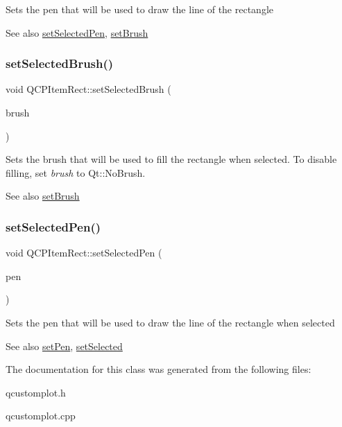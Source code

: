 Sets the pen that will be used to draw the line of the rectangle

\begin{DoxySeeAlso}{See also}
\hyperlink{class_q_c_p_item_rect_a52a1bcb2dc753a538e406a2ba3cf21ce}{set\+Selected\+Pen}, \hyperlink{class_q_c_p_item_rect_abbd4e346a03513ee466afc25d9c75446}{set\+Brush} 
\end{DoxySeeAlso}
\mbox{\label{class_q_c_p_item_rect_abd1792859844118dedee86223cede7af}} 
\subsubsection{\texorpdfstring{set\+Selected\+Brush()}{setSelectedBrush()}}
{\footnotesize\ttfamily void Q\+C\+P\+Item\+Rect\+::set\+Selected\+Brush (\begin{DoxyParamCaption}\item[{const Q\+Brush \&}]{brush }\end{DoxyParamCaption})}

Sets the brush that will be used to fill the rectangle when selected. To disable filling, set {\itshape brush} to Qt\+::\+No\+Brush.

\begin{DoxySeeAlso}{See also}
\hyperlink{class_q_c_p_item_rect_abbd4e346a03513ee466afc25d9c75446}{set\+Brush} 
\end{DoxySeeAlso}
\mbox{\label{class_q_c_p_item_rect_a52a1bcb2dc753a538e406a2ba3cf21ce}} 
\subsubsection{\texorpdfstring{set\+Selected\+Pen()}{setSelectedPen()}}
{\footnotesize\ttfamily void Q\+C\+P\+Item\+Rect\+::set\+Selected\+Pen (\begin{DoxyParamCaption}\item[{const Q\+Pen \&}]{pen }\end{DoxyParamCaption})}

Sets the pen that will be used to draw the line of the rectangle when selected

\begin{DoxySeeAlso}{See also}
\hyperlink{class_q_c_p_item_rect_a483c0da5a17e1646cd17ddea2c124e7d}{set\+Pen}, \hyperlink{class_q_c_p_abstract_item_a203de94ad586cc44d16c9565f49d3378}{set\+Selected} 
\end{DoxySeeAlso}


The documentation for this class was generated from the following files\+:\begin{DoxyCompactItemize}
\item 
qcustomplot.\+h\item 
qcustomplot.\+cpp\end{DoxyCompactItemize}
